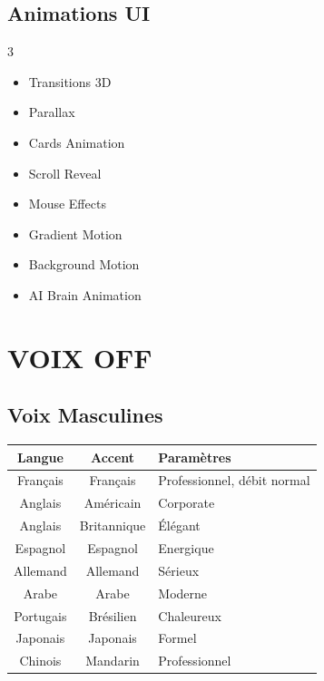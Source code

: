 \documentclass[12pt,a4paper,oneside]{book}
\begin{document}
\section{Animations UI}
\begin{multicols}{3}
\begin{itemize}
\item Transitions 3D
\item Parallax
\item Cards Animation
\item Scroll Reveal
\item Mouse Effects
\item Gradient Motion
\item Background Motion
\item AI Brain Animation
\end{itemize}
\end{multicols}

\chapter{VOIX OFF}

\section{Voix Masculines}
\bigskip
\begin{center}
\begin{tabular}{|c|c|p{6cm}|}
\hline
\rowcolor{bleuNuit}
\color{white}\textbf{Langue} & \color{white}\textbf{Accent} & \color{white}\textbf{Paramètres} \\
\hline
Français & Français & Professionnel, débit normal \\
\hline
Anglais & Américain & Corporate \\
\hline
Anglais & Britannique & Élégant \\
\hline
Espagnol & Espagnol & Energique \\
\hline
Allemand & Allemand & Sérieux \\
\hline
Arabe & Arabe & Moderne \\
\hline
Portugais & Brésilien & Chaleureux \\
\hline
Japonais & Japonais & Formel \\
\hline
Chinois & Mandarin & Professionnel \\
\hline
\end{tabular}
\end{center}
\end{document}
